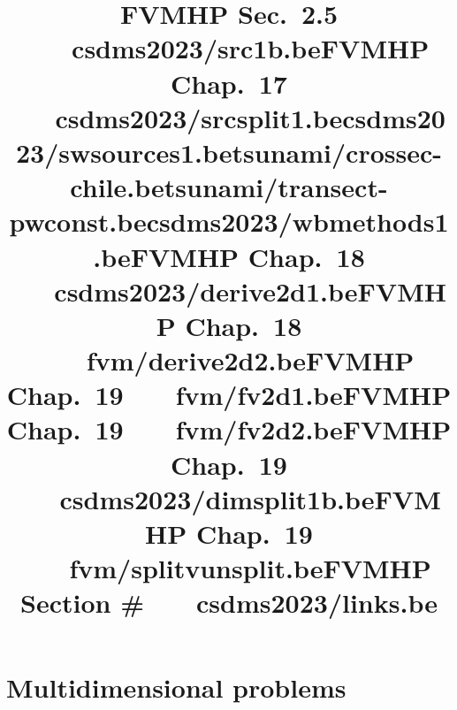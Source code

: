\documentclass{beamer}
\newcommand{\mkslide}[1]{\title{CSDMS Tutorial on FV Methods, May 2023}
   }
\newcommand{\mkslidelabel}[2]{\title{#2}}
\renewcommand{\mkslide}[1]{\title{#1}}
\renewcommand{\mkslidelabel}[2]{\title{#2 ~~~#1}}
\begin{document}
\mkslidelabel{csdms2023/src1b.be}{FVMHP Sec.\ 2.5}
\mkslidelabel{csdms2023/srcsplit1.be}{FVMHP Chap.\ 17}
\mkslide{csdms2023/swsources1.be}

\mkslide{tsunami/crossec-chile.be}
\mkslide{tsunami/transect-pwconst.be}
\mkslide{csdms2023/wbmethods1.be}

\section{Multidimensional problems}
\mkslidelabel{csdms2023/derive2d1.be}{FVMHP Chap.\ 18}
\mkslidelabel{fvm/derive2d2.be}{FVMHP Chap.\ 18}
\mkslidelabel{fvm/fv2d1.be}{FVMHP Chap.\ 19}
\mkslidelabel{fvm/fv2d2.be}{FVMHP Chap.\ 19}
\mkslidelabel{csdms2023/dimsplit1b.be}{FVMHP Chap.\ 19}
\mkslidelabel{fvm/splitvunsplit.be}{FVMHP Chap.\ 19}

\mkslidelabel{csdms2023/links.be}{FVMHP Section \#}
\end{document}
